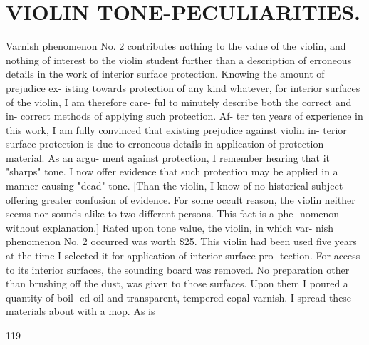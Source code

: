 \documentclass{article}
\begin{document}
\section*{VIOLIN TONE-PECULIARITIES.}
Varnish phenomenon No. 2 contributes nothing to the value of the violin, and nothing of interest to the violin student further than a description of erroneous details in the work of interior surface protection. Knowing the amount of prejudice ex- isting towards protection of any kind whatever, for interior surfaces of the violin, I am therefore care- ful to minutely describe both the correct and in- correct methods of applying such protection. Af- ter ten years of experience in this work, I am fully convinced that existing prejudice against violin in- terior surface protection is due to erroneous details in application of protection material. As an argu- ment against protection, I remember hearing that it "sharps" tone. I now offer evidence that such protection may be applied in a manner causing "dead" tone. [Than the violin, I know of no historical subject offering greater confusion of evidence. For some occult reason, the violin neither seems nor sounds alike to two different persons. This fact is a phe- nomenon without explanation.] Rated upon tone value, the violin, in which var- nish phenomenon No. 2 occurred was worth \$25. This violin had been used five years at the time I selected it for application of interior-surface pro- tection. For access to its interior surfaces, the sounding board was removed. No preparation other than brushing off the dust, was given to those surfaces. Upon them I poured a quantity of boil- ed oil and transparent, tempered copal varnish. I spread these materials about with a mop. As is

119
\end{document}
